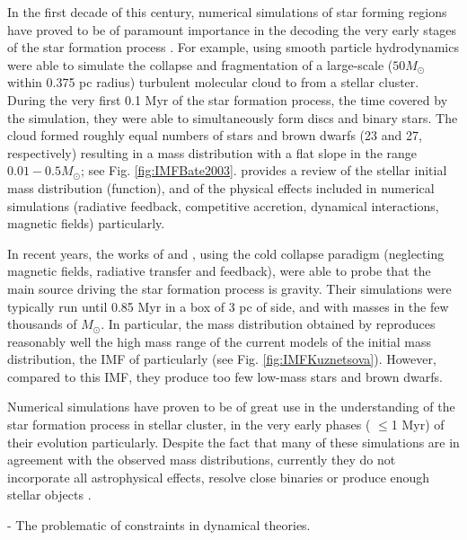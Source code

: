 In the first decade of this century, numerical simulations of star forming regions have proved to be of paramount importance in the decoding the very early stages of the star formation process \citep{2003MNRAS.339..577B,2005A&A...435..611J,2009MNRAS.392..590B,2009MNRAS.392.1363B,2009MNRAS.397..232B}. For example, \citet{2003MNRAS.339..577B} using smooth particle hydrodynamics were able to simulate the collapse and fragmentation of a large-scale ($50 M_{\odot}$ within 0.375 pc radius) turbulent molecular cloud to from a stellar cluster. During the very first 0.1 Myr of the star formation process, the time covered by the simulation, they were able to simultaneously form discs and binary stars. The cloud formed roughly equal numbers of stars and brown dwarfs (23 and 27, respectively) resulting in a mass distribution with a flat slope in the range $0.01-0.5 M_{\odot}$; see Fig. \ref{fig:IMFBate2003}. \citet{Offner2014} provides a review of the stellar initial mass distribution (function), and of the physical effects included in numerical simulations (radiative feedback, competitive accretion, dynamical interactions, magnetic fields) particularly. 

In recent years, the works of \citet{2015ApJ...815...27K} and \citet{2015MNRAS.452..566B}, using the cold collapse paradigm (neglecting magnetic fields, radiative transfer and feedback), were able to probe that the main source driving the star formation process is gravity. Their simulations were typically run until 0.85 Myr in a box of 3 pc of side, and with masses in the few thousands of $M_{\odot}$. In particular, the mass distribution obtained by \citet{2015ApJ...815...27K} reproduces reasonably well the high mass range of the current models of the initial mass distribution, the IMF of \citet{Chabrier2005} particularly (see Fig. \ref{fig:IMFKuznetsova}). However, compared to this IMF, they produce too few low-mass stars and brown dwarfs.


Numerical simulations have proven to be of great use in the understanding of the star formation process in stellar cluster, in the very early phases ( $\leq$1 Myr) of their evolution particularly.  Despite the fact that many of these simulations are in agreement with the observed mass distributions, currently they do not incorporate all astrophysical effects, resolve close binaries or produce enough stellar objects \citep{Offner2014}. 

- The problematic of constraints in dynamical theories.

